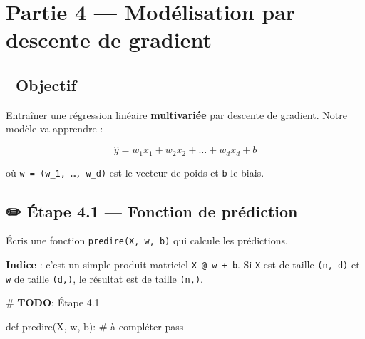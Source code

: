 \documentclass[
  french,
  11pt,
  a4paper,
]{scrbook}
\newenvironment{Shaded}{}{}
\newcommand{\AlertTok}[1]{\textcolor[rgb]{1.00,0.33,0.33}{\textbf{#1}}}
\newcommand{\CommentTok}[1]{\textcolor[rgb]{0.42,0.45,0.49}{#1}}
\newcommand{\ControlFlowTok}[1]{\textcolor[rgb]{0.84,0.23,0.29}{#1}}
\newcommand{\KeywordTok}[1]{\textcolor[rgb]{0.84,0.23,0.29}{#1}}
\newcommand{\NormalTok}[1]{\textcolor[rgb]{0.14,0.16,0.18}{#1}}
\begin{document}
\chapter{Partie 4 --- Modélisation par descente de
gradient}\label{partie-4-moduxe9lisation-par-descente-de-gradient}

\section{🎯 Objectif}\label{objectif-2}

Entraîner une régression linéaire \textbf{multivariée} par descente de
gradient. Notre modèle va apprendre :

\[\hat{y} = w_1 x_1 + w_2 x_2 + \dots + w_d x_d + b\]

où \texttt{w\ =\ (w\_1,\ …,\ w\_d)} est le vecteur de poids et
\texttt{b} le biais.

\section{✏️ Étape 4.1 --- Fonction de
prédiction}\label{uxe9tape-4.1-fonction-de-pruxe9diction}

\begin{tcolorbox}[enhanced jigsaw, arc=.35mm, bottomrule=.15mm, bottomtitle=1mm, breakable, colback=white, colbacktitle=quarto-callout-note-color!10!white, colframe=quarto-callout-note-color-frame, coltitle=black, left=2mm, leftrule=.75mm, opacityback=0, opacitybacktitle=0.6, rightrule=.15mm, title={📝 À faire}, titlerule=0mm, toprule=.15mm, toptitle=1mm]

Écris une fonction \texttt{predire(X,\ w,\ b)} qui calcule les
prédictions.

\textbf{Indice} : c'est un simple produit matriciel
\texttt{X\ @\ w\ +\ b}. Si \texttt{X} est de taille \texttt{(n,\ d)} et
\texttt{w} de taille \texttt{(d,)}, le résultat est de taille
\texttt{(n,)}.

\end{tcolorbox}

\begin{Shaded}
\begin{Highlighting}[]
\CommentTok{\# }\AlertTok{TODO}\CommentTok{: Étape 4.1}

\KeywordTok{def}\NormalTok{ predire(X, w, b):}
    \CommentTok{\# à compléter}
    \ControlFlowTok{pass}
\end{Highlighting}
\end{Shaded}
\end{document}
